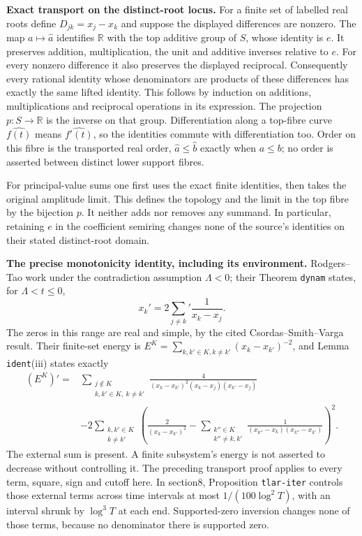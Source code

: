 \RD\textbf{Exact transport on the distinct-root locus.}
For a finite set of labelled real roots define
$D_{jk}=x_j-x_k$ and suppose the displayed differences are nonzero.
The map $a\mapsto\widehat a$ identifies $\mathbb R$ with the top
additive group of $S$, whose identity is $e$. It preserves addition,
multiplication, the unit and additive inverses relative to $e$.
For every nonzero difference it also preserves the displayed
reciprocal. Consequently every rational identity whose denominators
are products of these differences has exactly the same lifted identity.
This follows by induction on additions, multiplications and reciprocal
operations in its expression. The projection $p:S\to\mathbb R$
is the inverse on that group. Differentiation along a top-fibre curve
$\widehat{f(t)}$ means $\widehat{f'(t)}$, so the identities commute
with differentiation too. Order on this fibre is the transported real
order, $\widehat a\le\widehat b$ exactly when $a\le b$; no order is
asserted between distinct lower support fibres.

For principal-value sums one first uses the exact finite identities,
then takes the original amplitude limit. This defines the topology and
the limit in the top fibre by the bijection $p$. It neither adds nor
removes any summand. In particular, retaining $e$ in the coefficient
semiring changes none of the source's identities on their stated
distinct-root domain.

\RD\textbf{The precise monotonicity identity, including its environment.}
Rodgers--Tao work under the contradiction assumption $\Lambda<0$;
their Theorem \texttt{dynam} states, for $\Lambda<t\le0$,
\[
 x_k'=2\sum_{j\ne k}'\frac1{x_k-x_j}.
\]
The zeros in this range are real and simple, by the cited
Csordas--Smith--Varga result. Their finite-set energy is
$E^K=\sum_{k,k'\in K,k\ne k'}(x_k-x_{k'})^{-2}$, and Lemma
\texttt{ident}(iii) states exactly
\begin{align*}
 (E^K)'={}&
 \sum_{\substack{j\notin K\\ k,k'\in K,\ k\ne k'}}
 \frac4{(x_k-x_{k'})^2(x_k-x_j)(x_{k'}-x_j)}\\
 &-2\sum_{\substack{k,k'\in K\\k\ne k'}}
 \left(\frac2{(x_k-x_{k'})^2}
 -\sum_{\substack{k''\in K\\k''\ne k,k'}}
 \frac1{(x_{k''}-x_k)(x_{k''}-x_{k'})}\right)^2.
\end{align*}
The external sum is present. A finite subsystem's energy is not
asserted to decrease without controlling it. The preceding transport
proof applies to every term, square, sign and cutoff here. In section8,
Proposition \texttt{tlar-iter} controls those external terms across
time intervals at most $1/(100\log^2T)$, with an interval shrunk by
$\log^3T$ at each end. Supported-zero inversion changes none of those
terms, because no denominator there is supported zero.

